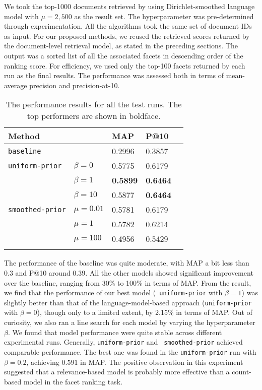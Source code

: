 We took the top-1000 documents retrieved by using Dirichlet-smoothed language
model with $\mu = 2,500$ as the result set.  The hyperparameter was
pre-determined through experimentation.  All the algorithms took the same set
of document IDs as input.  For our proposed methods, we reused the retrieved
scores returned by the document-level retrieval model, as stated in the
preceding sections.  The output was a sorted list of all the associated facets
in descending order of the ranking score.  For efficiency, we used only the
top-100 facets returned by each run as the final results.  The performance was
assessed both in terms of mean-average precision and precision-at-10.

\begin{table}[ht!]
  \centering
  \begin{tabular}{lllll}
    Method & & MAP & P@10 & \\
    \hline
    {\tt baseline} & & 0.2996 & 0.3857 & \\
    {\tt uniform-prior} & $\beta = 0$ \cite{balog2009language} & 0.5775 & 0.6179 & \\
    & $\beta = 1$ & {\bf 0.5899} & {\bf 0.6464} & \\
    & $\beta = 10$ & 0.5877 & {\bf 0.6464} & \\
    {\tt smoothed-prior} & $\mu = 0.01$ & 0.5781 & 0.6179 &\\
    & $\mu = 1$ & 0.5782 & 0.6214 & \\
    & $\mu = 100$ & 0.4956 & 0.5429 & \\
    \\
  \end{tabular}
  \caption{The performance results for all the test runs.  The top performers are
  shown in boldface.} \label{t:performance}
\end{table}

The performance of the baseline was quite moderate, with MAP a bit less
than 0.3 and P@10 around 0.39.  All the other models showed significant
improvement over the baseline, ranging from 30\% to 100\% in terms of MAP.
From the result, we find that the performance of our best model ({\tt
uniform-prior} with $\beta = 1$) was slightly better than that of the
language-model-based approach \cite{balog2009language} ({\tt uniform-prior}
with $\beta = 0$), though only to a limited extent, by 2.15\% in terms of MAP.
Out of curiosity, we also ran a line search for each model by varying the
hyperparameter $\beta$.  We found that model performance were quite stable
across different experimental runs.  Generally, {\tt uniform-prior} and {\tt
smoothed-prior} achieved comparable performance.  The best one was found in the
{\tt uniform-prior} run with $\beta = 0.2$, achieving $0.591$ in MAP.  The
positive observation in this experiment suggested that a relevance-based
model is probably more effective than a count-based model in the
facet ranking task.  

